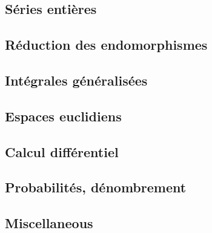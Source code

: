 \documentclass[12pt]{scrartcl}
\begin{document}
    \subsection{Séries entières}
    

    \subsection{Réduction des endomorphismes}
    

    \subsection{Intégrales généralisées}
    

    \subsection{Espaces euclidiens}
    

    \subsection{Calcul différentiel}
    

    \subsection{Probabilités, dénombrement}
    

    \subsection{Miscellaneous}
    

    \printnomenclature
\end{document}
